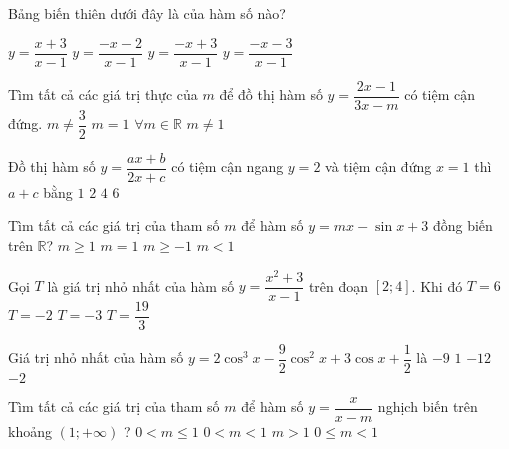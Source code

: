 \begin{ex}%
	Bảng biến thiên dưới đây là của hàm số nào?
	\begin{center}
	\end{center}
\choice
	{$y=\dfrac{x+3}{x-1}$}
	{$y=\dfrac{-x-2}{x-1}$}
	{\True $y=\dfrac{-x+3}{x-1}$}
	{$y=\dfrac{-x-3}{x-1}$}
\end{ex}
\begin{ex}%
	Tìm tất cả các giá trị thực của $m$ để đồ thị hàm số $y=\dfrac{2x-1}{3x-m}$ có tiệm cận đứng.
\choice
	{\True $m\neq \dfrac{3}{2}$}
	{$m=1$}
	{$\forall m \in  \mathbb{R}$}
	{$m\neq 1$} 
\end{ex}
\begin{ex}%
	Đồ thị hàm số $y=\dfrac{ax+b}{2x+c}$ có tiệm cận ngang $y=2$ và tiệm cận đứng $x=1$ thì $a+c$ bằng
	\choice
	{$1$}
	{\True $2$}
	{$4$}
	{$6$} 
\end{ex}
\begin{ex}%
	Tìm tất cả các giá trị của tham số $m$ để hàm số $y=mx-\sin x +3$ đồng biến trên $\mathbb{R}$?
\choice
	{\True $m\geq 1$}
	{$m=1$}
	{$m\geq -1$}
	{$m<1$} 
\end{ex}
\begin{ex}%
	Gọi $T$ là giá trị nhỏ nhất của hàm số $y=\dfrac{x^2+3}{x-1}$ trên đoạn $\left[2;4\right]$. Khi đó
\choice
	{\True $T=6$}
	{$T=-2$}
	{$T=-3$}
	{$T=\dfrac{19}{3}$} 
\end{ex}
\begin{ex}%
	Giá trị nhỏ nhất của hàm số $y=2{\cos}^3 x-\dfrac{9}{2}{\cos}^2 x +3\cos x+\dfrac{1}{2}$ là
\choice
	{\True $-9$}
	{$1$}
	{$-12$}
	{$-2$}
\end{ex}
\begin{ex}%
	Tìm tất cả các giá trị của tham số $m$ để hàm số $y=\dfrac{x}{x-m}$ nghịch biến trên khoảng $\left(1;+\infty\right)$ ?
	\choice
	{\True $0<m\leq1 $}
	{$0<m<1$}
	{$m>1$}
	{$0\leq m<1$} 
\end{ex}
